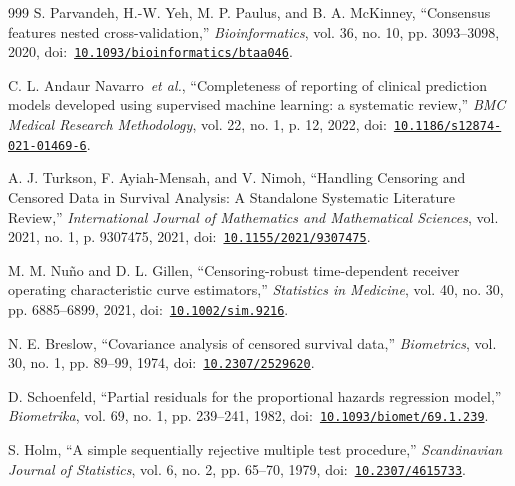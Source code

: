 \begin{thebibliography}{999}
\def\currentbiburl{https://doi.org/10.1093/bioinformatics/btaa046}
 S. Parvandeh, H.-W. Yeh, M. P. Paulus, and B. A. McKinney, ``Consensus features nested cross-validation,'' \emph{Bioinformatics}, vol. 36, no. 10, pp. 3093--3098, 2020, doi:~\href{https://doi.org/10.1093/bioinformatics/btaa046}{\nolinkurl{10.1093/bioinformatics/btaa046}}.

\def\currentbiburl{https://doi.org/10.1186/s12874-021-01469-6}
 C. L. Andaur Navarro~\emph{et al.}, ``Completeness of reporting of clinical prediction models developed using supervised machine learning: a systematic review,'' \emph{BMC Medical Research Methodology}, vol. 22, no. 1, p. 12, 2022, doi:~\href{https://doi.org/10.1186/s12874-021-01469-6}{\nolinkurl{10.1186/s12874-021-01469-6}}.

\def\currentbiburl{https://doi.org/10.1155/2021/9307475}
 A. J. Turkson, F. Ayiah-Mensah, and V. Nimoh, ``Handling Censoring and Censored Data in Survival Analysis: A Standalone Systematic Literature Review,'' \emph{International Journal of Mathematics and Mathematical Sciences}, vol. 2021, no. 1, p. 9307475, 2021, doi:~\href{https://doi.org/10.1155/2021/9307475}{\nolinkurl{10.1155/2021/9307475}}.

\def\currentbiburl{https://doi.org/10.1002/sim.9216}
 M. M. Nuño and D. L. Gillen, ``Censoring-robust time-dependent receiver operating characteristic curve estimators,'' \emph{Statistics in Medicine}, vol. 40, no. 30, pp. 6885--6899, 2021, doi:~\href{https://doi.org/10.1002/sim.9216}{\nolinkurl{10.1002/sim.9216}}.

\def\currentbiburl{https://doi.org/10.2307/2529620}
 N. E. Breslow, ``Covariance analysis of censored survival data,'' \emph{Biometrics}, vol. 30, no. 1, pp. 89--99, 1974, doi:~\href{https://doi.org/10.2307/2529620}{\nolinkurl{10.2307/2529620}}.

\def\currentbiburl{https://doi.org/10.1093/biomet/69.1.239}
D. Schoenfeld, ``Partial residuals for the proportional hazards regression model,'' \emph{Biometrika}, vol. 69, no. 1, pp. 239--241, 1982, doi:~\href{https://doi.org/10.1093/biomet/69.1.239}{\nolinkurl{10.1093/biomet/69.1.239}}.

\def\currentbiburl{https://doi.org/10.2307/4615733}
S. Holm, ``A simple sequentially rejective multiple test procedure,'' \emph{Scandinavian Journal of Statistics}, vol. 6, no. 2, pp. 65--70, 1979, doi:~\href{https://doi.org/10.2307/4615733}{\nolinkurl{10.2307/4615733}}.


\end{thebibliography}
